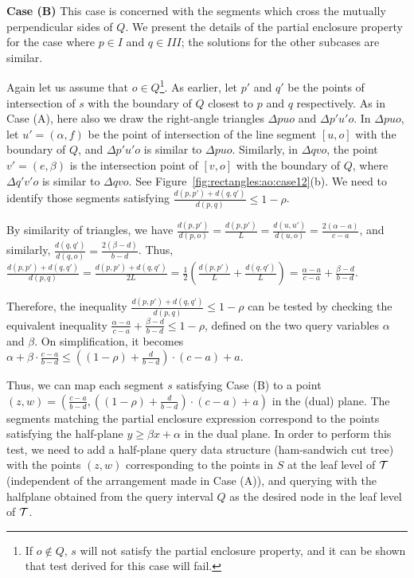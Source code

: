 {\bf Case (B)} This case is concerned with the segments which cross 
the mutually perpendicular sides of $Q$. We present the details 
of the partial enclosure property for the case where $p \in I$ 
and $q \in III$; the solutions for the other subcases  
are similar. 

Again let us assume that $o \in Q$\footnote{If $o \not\in Q$, $s$ 
will not satisfy the partial enclosure property, and it can be shown 
that test derived for this case will fail.}. As earlier, let $p'$ 
and $q'$ be the points of intersection of $s$ with the boundary of 
$Q$ closest to $p$ and $q$ respectively. As in Case (A), here also 
we draw the 
right-angle triangles $\Delta p u o$ and  $\Delta p'u'o$. In 
$\Delta p u o$, let $u' = (\alpha, f)$ be the point of intersection 
of the line segment $[u, o]$ with the boundary of $Q$, and 
$\Delta p'u'o$ is similar to $\Delta p u o$. Similarly, in 
$\Delta q v o$, the point $v' = (e, \beta)$ 
is the intersection point of $[v, o]$ with the boundary of $Q$, 
where $\Delta q' v' o$ is similar to $\Delta q v o$. See 
Figure~\ref{fig:rectangles:ao:case12}(b). We need to identify those 
segments satisfying $\frac{d(p, p')+d(q, q')}{d(p, q)} \leq 1-\rho$. 

By similarity of triangles, we have  $\frac{d(p, p')}{d(p, o)} = 
\frac{d(p, p')}{L} = \frac{d(u, u')}{d(u, o)} = \frac{2(\alpha - a)}
{c - a}$, and similarly, $\frac{d(q, q')}{d(q, o)} = \frac{2(\beta - d)}{b - d}$. 
Thus,
$\frac{d(p, p') + d(q, q')}{d(p, q)}=\frac{d(p, p') + d(q, q')}{2L} 
=\frac{1}{2} \left (\frac{d(p, p')}{L} + \frac{d(q, q')}{L} \right) 
= \frac{\alpha - a}{c - a} + \frac{\beta - d}{b - d}$.

Therefore, the inequality $\frac{d(p, p') + d(q, q')}{d(p, q)} 
\leq 1 - \rho$ can be tested by checking the equivalent inequality 
$\frac{\alpha - a}{c - a} + \frac{\beta - d}{b - d} \leq 1 - \rho$, 
defined on the two query variables $\alpha$ and $\beta$. On 
simplification, it becomes $\alpha + \beta \cdot \frac{c-a}{b-d} \leq 
\left ( (1 - \rho) + \frac{d}{b-d} \right ) \cdot (c-a) + a$.

Thus, we can map each segment $s$ satisfying Case (B) to a point  $(z,w)=
\left(\frac{c-a}{b-d}, \left ( (1 - \rho) + \frac{d}{b-d} \right ) \cdot 
(c-a) + a \right )$ in the (dual) plane. The segments matching the 
partial enclosure expression correspond to the points satisfying the 
half-plane $y \geq \beta x + \alpha$ in the dual plane. In order 
to perform this test, we need to add a half-plane query data structure
(ham-sandwich cut tree) \cite{chan2012} with the points $(z,w)$ 
corresponding to the 
points in $S$ at the leaf level of $\cal T$ (independent of the arrangement 
made in Case (A)), and querying with the halfplane obtained from the query 
interval $Q$ as the desired node in the leaf level of $\cal T$. 

